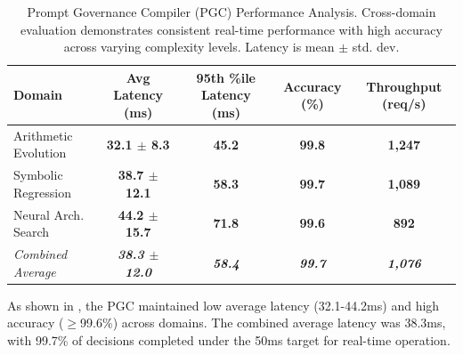 \documentclass[manuscript,screen,review,anonymous,9pt]{acmart}
\newcommand{\tablesize}{\footnotesize} %
\newcommand{\tablenumfmt}[1]{\textbf{#1}}
\newcommand{\tableheader}[1]{\textbf{#1}}
\begin{document}
\begin{table}[htbp]
\centering
\caption{Prompt Governance Compiler (PGC) Performance Analysis. Cross-domain evaluation demonstrates consistent real-time performance with high accuracy across varying complexity levels. Latency is mean $\pm$ std. dev.}
\label{tab:pgc_comprehensive}
\tablesize
\begin{tabular}{@{}lcccc@{}}
\toprule
\tableheader{Domain} & \tableheader{Avg Latency (ms)} & \tableheader{95th \%ile Latency (ms)} & \tableheader{Accuracy (\%)} & \tableheader{Throughput (req/s)} \\
\midrule
Arithmetic Evolution & \tablenumfmt{32.1 $\pm$ 8.3}   & \tablenumfmt{45.2}  & \tablenumfmt{99.8} & \tablenumfmt{1,247} \\
Symbolic Regression  & \tablenumfmt{38.7 $\pm$ 12.1}  & \tablenumfmt{58.3}  & \tablenumfmt{99.7} & \tablenumfmt{1,089} \\
Neural Arch. Search & \tablenumfmt{44.2 $\pm$ 15.7}  & \tablenumfmt{71.8}  & \tablenumfmt{99.6} & \tablenumfmt{892}   \\
\midrule
\textit{Combined Average} & \textit{\tablenumfmt{38.3 $\pm$ 12.0}} & \textit{\tablenumfmt{58.4}} & \textit{\tablenumfmt{99.7}} & \textit{\tablenumfmt{1,076}} \\
\bottomrule
\end{tabular}
\end{table}

As shown in , the PGC maintained low average latency (32.1-44.2ms) and high accuracy ($\geq$99.6\%) across domains. The combined average latency was 38.3ms, with 99.7\% of decisions completed under the 50ms target for real-time operation.
\end{document}
